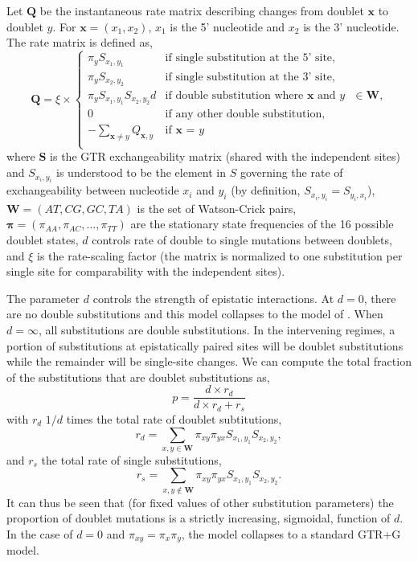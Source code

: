 \documentclass[11pt]{article}
\begin{document}
Let $\boldsymbol{Q}$ be the instantaneous rate matrix describing changes from doublet $\boldsymbol{x}$ to doublet $y$.
For $\boldsymbol{x} = (x_1, x_2)$, $x_1$ is the 5' nucleotide and $x_2$ is the 3' nucleotide.
The rate matrix is defined as,
\begin{equation}
\label{eq:Q}
\boldsymbol{Q} = \xi \times
\begin{cases}
   \pi_{y} S_{x_1, y_1} & \mbox{if single substitution at the 5' site,} \\
   \pi_{y} S_{x_2, y_2} & \mbox{if single substitution at the 3' site,} \\
   \pi_{y} S_{x_1, y_1} S_{x_2, y_2} d & \mbox{if double substitution where ${\boldsymbol{x}}$ and ${y}$ $\in {\boldsymbol{W}}$,} \\
   0 & \mbox{if any other double substitution,} \\
   - \sum_{\boldsymbol{x} \ne y} Q_{\boldsymbol{x},y}& \mbox{if $\boldsymbol{x}$ = $y$} \\
   \end{cases}
\end{equation}
where $\boldsymbol{S}$ is the GTR exchangeability matrix (shared with the independent sites) and $S_{x_i,y_i}$ is understood to be the element in $S$ governing the rate of exchangeability between nucleotide $x_i$ and $y_i$ (by definition, $S_{x_i,y_i} = S_{y_i,x_i}$),
${\boldsymbol{W}} = (AT, CG, GC, TA)$ is the set of Watson-Crick pairs,
$\boldsymbol{\pi} = (\pi_{AA}, \pi_{AC}, ..., \pi_{TT})$ are the stationary state frequencies of the 16 possible doublet states,
$d$ controls rate of double to single mutations between doublets,
and $\xi$ is the rate-scaling factor (the matrix is normalized to one substitution per single site for comparability with the independent sites).

The parameter $d$ controls the strength of epistatic interactions.
At $d = 0$, there are no double substitutions and this model collapses to the model of \cite{schoniger1994stochastic}.
When $d = \infty$, all substitutions are double substitutions.
In the intervening regimes, a portion of substitutions at epistatically paired sites will be doublet substitutions while the remainder will be single-site changes.
We can compute the total fraction of the substitutions that are doublet substitutions as,
\[
p = \frac{ d \times r_{d} }{d \times r_{d} + r_{s}}
\]
with $r_d$ $1 / d$ times the total rate of doublet subtitutions,
\[
  r_{d} = \sum_{x,y \in \boldsymbol{W}} \pi_{xy} \pi_{yx} S_{x_1,y_1} S_{x_2,y_2},
\]
and $r_s$ the total rate of single substitutions,
\[
  r_{s} = \sum_{x,y \not\in \boldsymbol{W}} \pi_{xy} \pi_{yx} S_{x_1,y_1} S_{x_2,y_2}.
\]
It can thus be seen that (for fixed values of other substitution parameters) the proportion of doublet mutations is a strictly increasing, sigmoidal, function of $d$.
In the case of $d = 0$ and $\pi_{xy} = \pi_x \pi_y$, the model collapses to a standard GTR+G model.
\end{document}
